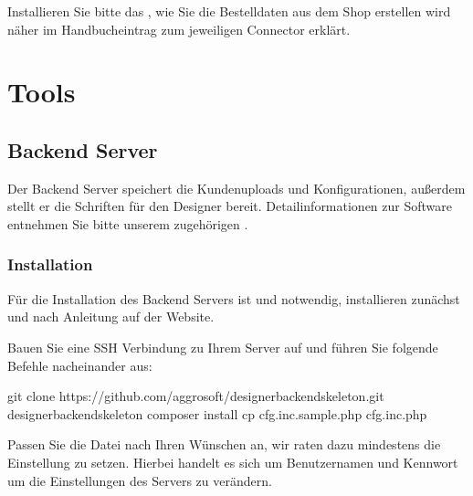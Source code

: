 \documentclass[letterpaper,10pt,ngerman]{sphinxmanual}
\begin{document}
Installieren Sie bitte das {\hyperref[\detokenize{tools/epstool::doc}]{}}, wie Sie die Bestelldaten aus dem Shop erstellen
wird näher im Handbucheintrag zum jeweiligen Connector erklärt.


\chapter{Tools}
\label{\detokenize{tools/index:tools}}\label{\detokenize{tools/index::doc}}

\section{Backend Server}
\label{\detokenize{tools/backend:backend-server}}\label{\detokenize{tools/backend::doc}}
Der Backend Server speichert die Kundenuploads und Konfigurationen, außerdem stellt er die Schriften für den Designer
bereit. Detailinformationen zur Software entnehmen Sie bitte unserem zugehörigen .


\subsection{Installation}
\label{\detokenize{tools/backend:installation}}
Für die Installation des Backend Servers ist  und  notwendig,
installieren zunächst  und  nach Anleitung auf der Website.

Bauen Sie eine SSH Verbindung zu Ihrem Server auf und führen Sie folgende Befehle nacheinander aus:

\begin{sphinxVerbatim}[commandchars=\\\{\}]
git clone https://github.com/aggrosoft/designer\PYGZhy{}backend\PYGZhy{}skeleton.git
 designer\PYGZhy{}backend\PYGZhy{}skeleton
composer install
cp cfg.inc.sample.php cfg.inc.php
\end{sphinxVerbatim}

Passen Sie die Datei  nach Ihren Wünschen an, wir raten dazu mindestens die Einstellung 
zu setzen. Hierbei handelt es sich um Benutzernamen und Kennwort um die Einstellungen des Servers zu verändern.
\end{document}

